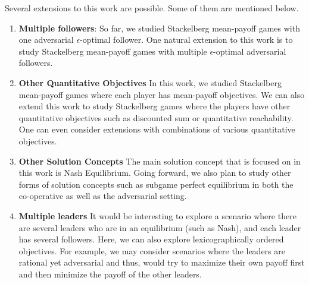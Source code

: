 Several extensions to this work are possible. Some of them are mentioned below.
\begin{enumerate}
    \item \textbf{Multiple followers}: So far, we studied Stackelberg mean-payoff games with one adversarial $\epsilon$-optimal follower. One natural extension to this work is to study Stackelberg mean-payoff games with multiple $\epsilon$-optimal adversarial followers.
    \item \textbf{Other Quantitative Objectives} In this work, we studied Stackelberg mean-payoff games where  each player has mean-payoff objectives. We can also extend this work to study Stackelberg games where the players have other quantitative objectives such as discounted sum or quantitative reachability.
    One can even consider extensions with combinations of various quantitative objectives.
    \item \textbf{Other Solution Concepts} The main solution concept that is focused on in this work is Nash Equilibrium. Going forward, we also plan to study other forms of solution concepts such as subgame perfect equilibrium in both the co-operative as well as the adversarial setting.
    \item \textbf{Multiple leaders} It would be interesting to explore a scenario where there are several leaders who are in an equilibrium (such as Nash), and each leader has several followers. Here, we can also explore lexicographically ordered objectives. For example, we may consider scenarios where the leaders are rational yet adversarial and thus, would try to maximize their own payoff first and then minimize the payoff of the other leaders. 
\end{enumerate}